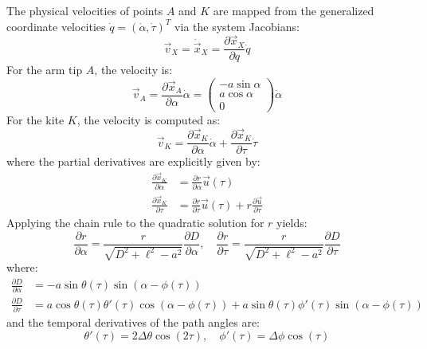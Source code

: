 \documentclass{article}
\begin{document}
The physical velocities of points $A$ and $K$ are mapped from the generalized coordinate velocities $\dot{q} = (\dot{\alpha}, \dot{\tau})^T$ via the system Jacobians:
\begin{equation}
\vec{v}_X = \dot{\vec{x}}_X = \frac{\partial \vec{x}_X}{\partial q} \dot{q}
\end{equation}
For the arm tip $A$, the velocity is:
\begin{equation}
\vec{v}_A = \frac{\partial \vec{x}_A}{\partial \alpha} \dot{\alpha} = \begin{pmatrix} -a\sin\alpha \\ a\cos\alpha \\ 0 \end{pmatrix} \dot{\alpha}
\end{equation}
For the kite $K$, the velocity is computed as:
\begin{equation}
\vec{v}_K = \frac{\partial \vec{x}_K}{\partial \alpha} \dot{\alpha} + \frac{\partial \vec{x}_K}{\partial \tau} \dot{\tau}
\end{equation}
where the partial derivatives are explicitly given by:
\begin{align}
\frac{\partial \vec{x}_K}{\partial \alpha} &= \frac{\partial r}{\partial \alpha} \vec{u}(\tau) \\
\frac{\partial \vec{x}_K}{\partial \tau} &= \frac{\partial r}{\partial \tau} \vec{u}(\tau) + r \frac{\partial \vec{u}}{\partial \tau}
\end{align}
Applying the chain rule to the quadratic solution for $r$ yields:
\begin{equation}
\frac{\partial r}{\partial \alpha} = \frac{r}{\sqrt{D^2 + \ell^2 - a^2}} \frac{\partial D}{\partial \alpha}, \quad \frac{\partial r}{\partial \tau} = \frac{r}{\sqrt{D^2 + \ell^2 - a^2}} \frac{\partial D}{\partial \tau}
\end{equation}
where:
\begin{align}
\frac{\partial D}{\partial \alpha} &= -a \sin\theta(\tau) \sin(\alpha - \phi(\tau)) \\
\frac{\partial D}{\partial \tau} &= a \cos\theta(\tau) \theta'(\tau) \cos(\alpha - \phi(\tau)) + a \sin\theta(\tau) \phi'(\tau) \sin(\alpha - \phi(\tau))
\end{align}
and the temporal derivatives of the path angles are:
\begin{equation}
\theta'(\tau) = 2 \Delta\theta \cos(2\tau), \quad \phi'(\tau) = \Delta\phi \cos(\tau)
\end{equation}
\end{document}
